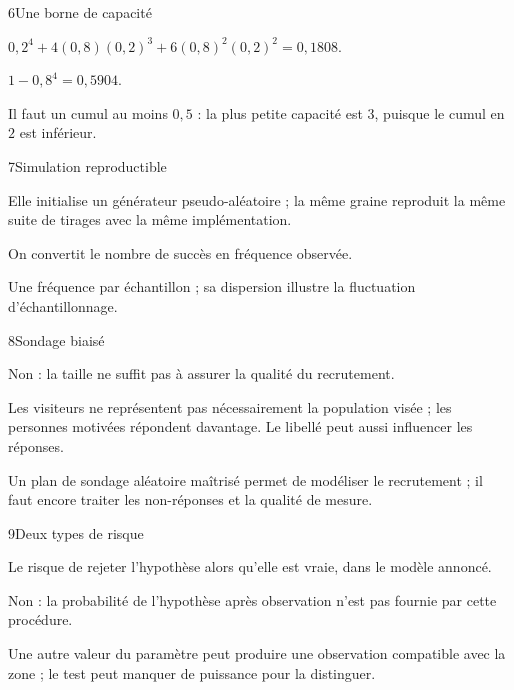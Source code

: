 \begin{corrige}{6}{Une borne de capacité}
\begin{questions}
\item $0{,}2^4+4(0{,}8)(0{,}2)^3+6(0{,}8)^2(0{,}2)^2=0{,}1808$.
\item $1-0{,}8^4=0{,}5904$.
\item Il faut un cumul au moins $0{,}5$ : la plus petite capacité est $3$, puisque le cumul en $2$ est inférieur.
\end{questions}
\end{corrige}
\begin{corrige}{7}{Simulation reproductible}
\begin{questions}
\item Elle initialise un générateur pseudo-aléatoire ; la même graine reproduit la même suite de tirages avec la même implémentation.
\item On convertit le nombre de succès en fréquence observée.
\item Une fréquence par échantillon ; sa dispersion illustre la fluctuation d’échantillonnage.
\end{questions}
\end{corrige}
\begin{corrige}{8}{Sondage biaisé}
\begin{questions}
\item Non : la taille ne suffit pas à assurer la qualité du recrutement.
\item Les visiteurs ne représentent pas nécessairement la population visée ; les personnes motivées répondent davantage. Le libellé peut aussi influencer les réponses.
\item Un plan de sondage aléatoire maîtrisé permet de modéliser le recrutement ; il faut encore traiter les non-réponses et la qualité de mesure.
\end{questions}
\end{corrige}
\begin{corrige}{9}{Deux types de risque}
\begin{questions}
\item Le risque de rejeter l’hypothèse alors qu’elle est vraie, dans le modèle annoncé.
\item Non : la probabilité de l’hypothèse après observation n’est pas fournie par cette procédure.
\item Une autre valeur du paramètre peut produire une observation compatible avec la zone ; le test peut manquer de puissance pour la distinguer.
\end{questions}
\end{corrige}
